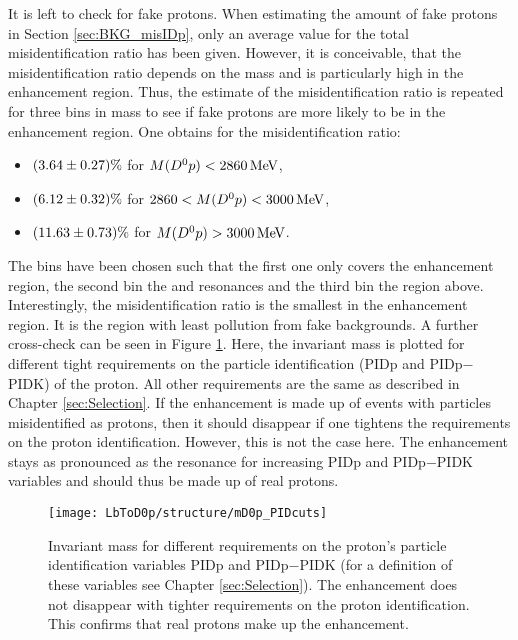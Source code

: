 It is left to check for fake protons.
When estimating the amount of fake protons in Section \ref{sec:BKG_misIDp}, only an average value for the total misidentification ratio has been given.
However, it is conceivable, that the misidentification ratio depends on the \Dz\proton mass and is particularly high in the enhancement region.
Thus, the estimate of the misidentification ratio is repeated for three bins in \Dz\proton mass to see if fake protons are more likely to be in the enhancement region.
One obtains for the misidentification ratio:
\begin{itemize}
    \item $(3.64 \pm 0.27)\%$ for $M({{D}^0}{p}) < 2860 \mathrm{\,Me\kern -0.1em V}$,
    \item $(6.12 \pm 0.32)\%$ for $2860 < M({{D}^0}{p}) < 3000 \mathrm{\,Me\kern -0.1em V}$,
    \item $(11.63 \pm 0.73)\%$ for $M({{D}^0}{p}) > 3000 \mathrm{\,Me\kern -0.1em V}$.
\end{itemize}
The bins have been chosen such that the first one only covers the enhancement region, the second bin the \LcResI and \LcResII resonances and the third bin the region above.
Interestingly, the misidentification ratio is the smallest in the enhancement region.
It is the region with least pollution from fake backgrounds.
A further cross-check can be seen in Figure \ref{fig:plot_mD0p_PIDcuts}. 
Here, the invariant \Dz\proton mass is plotted for different tight requirements on the particle identification (PIDp and PIDp$-$PIDK) of the proton.
All other requirements are the same as described in Chapter \ref{sec:Selection}.
If the enhancement is made up of events with particles misidentified as protons, then it should disappear if one tightens the requirements on the proton identification.
However, this is not the case here.
The enhancement stays as pronounced as the \LcResI resonance for increasing PIDp and PIDp$-$PIDK variables and should thus be made up of real protons.
\begin{figure}[tb]
	\centering
	\texttt{[image: LbToD0p/structure/mD0p\_PIDcuts]}
	\caption{Invariant \Dz\proton mass for different requirements on the proton's particle identification variables PIDp and PIDp$-$PIDK (for a definition of these variables see Chapter \ref{sec:Selection}). 
             The enhancement does not disappear with tighter requirements on the proton identification.
             This confirms that real protons make up the enhancement.
    }
	\label{fig:plot_mD0p_PIDcuts}
\end{figure}

